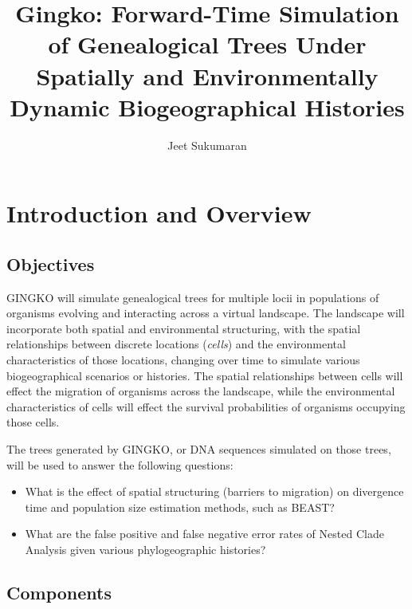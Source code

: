 \documentclass[11pt]{article}
\title{Gingko: Forward-Time Simulation of Genealogical Trees Under Spatially and Environmentally Dynamic Biogeographical Histories}
\author{Jeet Sukumaran}
\date{}
\begin{document}
\maketitle

\section{Introduction and Overview}

\subsection{Objectives}

GINGKO will simulate genealogical trees for multiple locii in populations of organisms evolving and interacting across a virtual landscape.
The landscape will incorporate both spatial and environmental structuring, with the spatial relationships between discrete locations (\textit{cells}) and the environmental characteristics of those locations, changing over time to simulate various biogeographical scenarios or histories.
The spatial relationships between cells will effect the migration of organisms across the landscape, while the environmental characteristics of cells  will effect the survival probabilities of organisms occupying those cells.

The trees generated by GINGKO, or DNA sequences simulated on those trees, will be used to answer the following questions:

\begin{itemize}
	\item What is the effect of spatial structuring (barriers to migration) on divergence time and population size estimation methods, such as BEAST?
	\item What are the false positive and false negative error rates of Nested Clade Analysis given various phylogeographic histories?
\end{itemize}





\subsection{Components}
\end{document}
